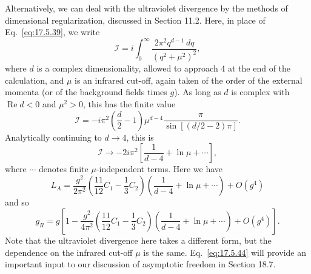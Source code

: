 Alternatively, we can deal with the ultraviolet divergence by the methods
of dimensional regularization, discussed in Section 11.2. Here, in place of
Eq.~\eqref{eq:17.5.39}, we write
\begin{equation}
\mathcal I=i\int_0^\infty\frac{2\pi^2q^{d-1}\,dq}{(q^2+\mu^2)^2},
\label{eq:17.5.42}
\end{equation}
where $d$ is a complex dimensionality, allowed to approach 4 at the end of
the calculation, and $\mu$ is an infrared cut-off, again taken of the order of
the external momenta (or of the background fields times $g$). As long as
$d$ is complex with $\operatorname{Re}d<0$ and $\mu^2>0$, this has the finite
value
\[
\mathcal I=-i\pi^2\left(\frac d2-1\right)\mu^{d-4}
\frac{\pi}{\sin[(d/2-2)\pi]}.
\]
Analytically continuing to $d\to4$, this is
\begin{equation}
\mathcal I\longrightarrow-2i\pi^2
\left[\frac1{d-4}+\ln\mu+\cdots\right],
\label{eq:17.5.43}
\end{equation}
where $\cdots$ denotes finite $\mu$-independent terms. Here we have
\[
L_A=\frac{g^2}{2\pi^2}\left(\frac{11}{12}C_1-\frac13C_2\right)
\left(\frac1{d-4}+\ln\mu+\cdots\right)+O(g^4)
\]
and so
\begin{equation}
g_R=g\left[1-\frac{g^2}{4\pi^2}
\left(\frac{11}{12}C_1-\frac13C_2\right)
\left(\frac1{d-4}+\ln\mu+\cdots\right)+O(g^4)\right].
\label{eq:17.5.44}
\end{equation}
Note that the ultraviolet divergence here takes a different form, but the
dependence on the infrared cut-off $\mu$ is the same. Eq.~\eqref{eq:17.5.44}
will provide an important input to our discussion of asymptotic freedom in
Section 18.7.
